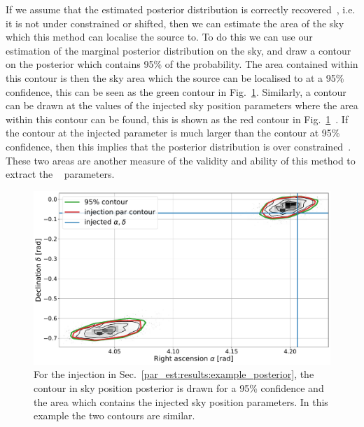 If we assume that the estimated posterior distribution is correctly
recovered~, i.e. it is not under constrained or
shifted, then we can estimate the area of the sky which this method can
localise the source to.  To do this we can use our estimation of the marginal
posterior distribution on the sky, and draw a contour on the posterior which
contains 95\% of the probability.  The area contained within this contour is
then the sky area which the source can be localised to at a 95\% confidence,
this can be seen as the green contour in
Fig.~\ref{par_est:results:sky_area_example}.  Similarly, a contour can be drawn
at the values of the injected sky position parameters where the area within
this contour can be found, this is shown as the red contour in
Fig.~\ref{par_est:results:sky_area_example}~. If the
contour at the injected parameter is much larger than the contour at 95\%
confidence, then this implies that the posterior distribution is over
constrained~.  These two areas are another measure of the validity and ability of this
method to extract the ~ parameters. 
%
\begin{figure}[ht]
    \centering
    \includegraphics[width=\linewidth]{C5_parameter/skyarea_example.pdf}
    \caption[Area of sky at 95\% confidence]{For the injection in
Sec.~\ref{par_est:results:example_posterior}, the contour in sky position
posterior is drawn for a 95\% confidence and the area which contains the
injected sky position parameters. In this example the two contours are
similar.~} \label{par_est:results:sky_area_example}
\end{figure}

